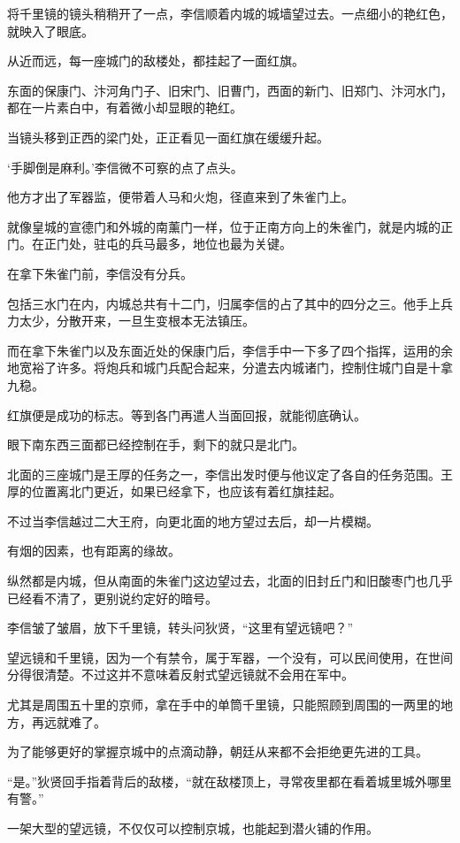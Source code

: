 将千里镜的镜头稍稍开了一点，李信顺着内城的城墙望过去。一点细小的艳红色，就映入了眼底。

从近而远，每一座城门的敌楼处，都挂起了一面红旗。

东面的保康门、汴河角门子、旧宋门、旧曹门，西面的新门、旧郑门、汴河水门，都在一片素白中，有着微小却显眼的艳红。

当镜头移到正西的梁门处，正正看见一面红旗在缓缓升起。

‘手脚倒是麻利。’李信微不可察的点了点头。

他方才出了军器监，便带着人马和火炮，径直来到了朱雀门上。

就像皇城的宣德门和外城的南薰门一样，位于正南方向上的朱雀门，就是内城的正门。在正门处，驻屯的兵马最多，地位也最为关键。

在拿下朱雀门前，李信没有分兵。

包括三水门在内，内城总共有十二门，归属李信的占了其中的四分之三。他手上兵力太少，分散开来，一旦生变根本无法镇压。

而在拿下朱雀门以及东面近处的保康门后，李信手中一下多了四个指挥，运用的余地宽裕了许多。将炮兵和城门兵配合起来，分遣去内城诸门，控制住城门自是十拿九稳。

红旗便是成功的标志。等到各门再遣人当面回报，就能彻底确认。

眼下南东西三面都已经控制在手，剩下的就只是北门。

北面的三座城门是王厚的任务之一，李信出发时便与他议定了各自的任务范围。王厚的位置离北门更近，如果已经拿下，也应该有着红旗挂起。

不过当李信越过二大王府，向更北面的地方望过去后，却一片模糊。

有烟的因素，也有距离的缘故。

纵然都是内城，但从南面的朱雀门这边望过去，北面的旧封丘门和旧酸枣门也几乎已经看不清了，更别说约定好的暗号。

李信皱了皱眉，放下千里镜，转头问狄贤，“这里有望远镜吧？”

望远镜和千里镜，因为一个有禁令，属于军器，一个没有，可以民间使用，在世间分得很清楚。不过这并不意味着反射式望远镜就不会用在军中。

尤其是周围五十里的京师，拿在手中的单筒千里镜，只能照顾到周围的一两里的地方，再远就难了。

为了能够更好的掌握京城中的点滴动静，朝廷从来都不会拒绝更先进的工具。

“是。”狄贤回手指着背后的敌楼，“就在敌楼顶上，寻常夜里都在看着城里城外哪里有警。”

一架大型的望远镜，不仅仅可以控制京城，也能起到潜火铺的作用。

